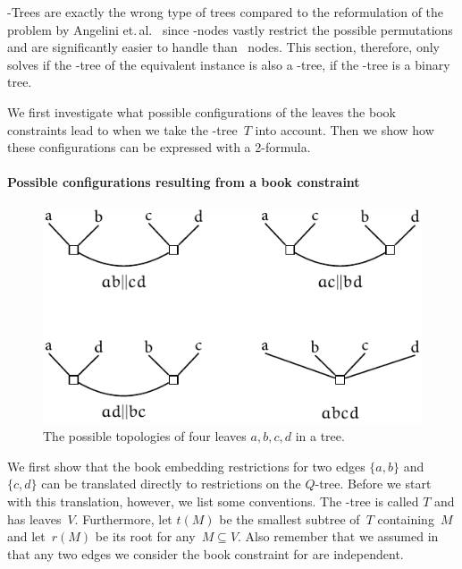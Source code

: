 \Q-Trees are exactly the wrong type of trees
compared to the reformulation of the \SEFECON problem by Angelini et.\,al.~\cite{angelini11} since \Q-nodes vastly restrict the possible
permutations and are significantly easier to handle than \PT~nodes. This
section, therefore, only solves \SEFECON if the \PT-tree of the equivalent \probPTree instance is also a \Q-tree, \ie if the \PT-tree is a binary tree.

We first investigate what possible configurations of the leaves the book constraints 
lead to when we take the \Q-tree~$T$ into account. Then we show how these configurations
can be expressed with a 2-\CNF formula.

\paragraph{Possible configurations resulting from a book constraint}

\begin{figure}[\placement]\centering
    \includegraphics{figures/t_topo1}
    \caption[Topologies of four leaves]{The possible topologies of four leaves $a, b, c, d$ in a tree.}
    \label{figure:topo1}
\end{figure}


We first show that the book embedding restrictions for two edges $\{a, b\}$ and $\{c, d\}$
can be translated directly to restrictions on the $Q$-tree.
Before we start with this translation, however, we list some conventions. The \Q-tree is called $T$ and has leaves~$V$. Furthermore, let $t(M)$ be the smallest subtree of~$T$ containing~$M$ and let~$r(M)$ be its root for any~$M \subseteq V$.
Also remember that we assumed  in  that any two edges we consider the book constraint for are independent.

